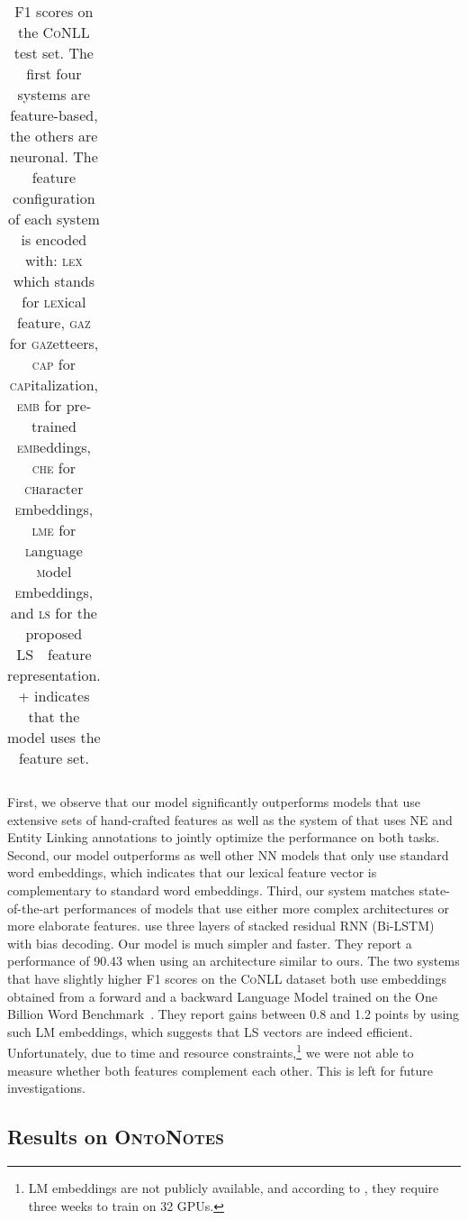 \documentclass[11pt]{article}
\newcommand{\conll}{\textsc{CoNLL}}
\newcommand{\onto}{\textsc{OntoNotes}}
\newcommand{\lr}{\textsc{LS}}
\newcommand{\lll}{\textsc{lex}}
\newcommand{\ggg}{\textsc{gaz}}
\newcommand{\ccc}{\textsc{cap}}
\newcommand{\chhh}{\textsc{che}}
\newcommand{\eee}{\textsc{emb}}
\newcommand{\sss}{\textsc{ls}}
\begin{document}
\begin{table}[!h]
\begin{center}
\begin{tabular}{|l|lllllll|c|}
				
			\end{tabular}
\end{center}
		
		
		\caption{F1 scores on the \conll{} test set. The first four systems are feature-based, the others are neuronal. The   feature configuration of each system is encoded with:  \lll{} which stands for \textsc{lex}ical feature, \ggg{} for \textsc{gaz}etteers, \ccc{} for \textsc{cap}italization, \eee{} for pre-trained \textsc{emb}eddings, \chhh{} for \textsc{ch}aracter \textsc{e}mbeddings, \textsc{lme} for \textsc{l}anguage \textsc{m}odel \textsc{e}mbeddings, and  \sss{} for the proposed \lr{~} feature representation. \textsc{+} indicates that the model uses the feature set.}
		
		\label{tab:conll.res} 
		
	\end{table}
		
	First, we observe that our model significantly  outperforms models that use extensive sets of hand-crafted features \cite{ratinov2009design,lin2009phrase} as well as the system of \cite{luo-2015} that uses NE and Entity Linking annotations to jointly optimize the performance on both tasks.  Second, our model outperforms as well other NN models that only use standard word embeddings, which indicates that our lexical feature vector is complementary to standard word embeddings. 
	Third, our system matches state-of-the-art performances of models that use either more complex architectures or more elaborate features.  use three layers of stacked residual RNN (Bi-LSTM) with bias decoding. Our model is much simpler and faster. They report a performance of 90.43 when using an architecture similar to ours. The two systems that have slightly higher F1 scores on the \conll{} dataset both use embeddings obtained from a forward and a backward Language Model trained on the One Billion Word Benchmark~\cite{chelba2013one}. They report gains between 0.8 and 1.2 points by using such LM embeddings, which suggests that \lr{} vectors are indeed efficient. Unfortunately, due to time and resource constraints,\footnote{LM embeddings are not publicly available, and according to , they require three weeks to train on 32 GPUs.} we were not able to measure whether both features complement each other. This is left for future investigations. 
	
	\subsection{Results on \onto}	
	
\end{document}
